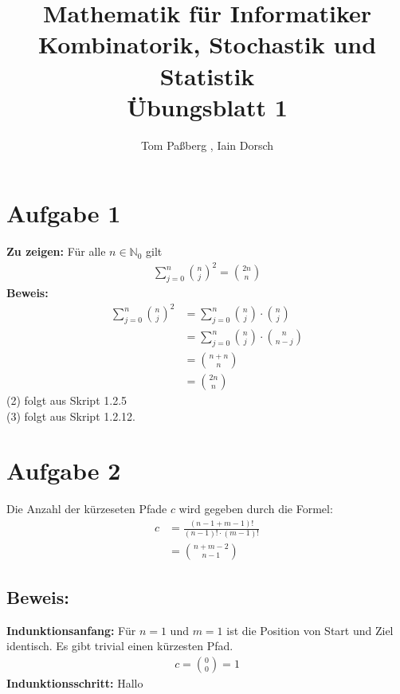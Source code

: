 \documentclass[a4paper]{scrartcl}
\title{Mathematik für Informatiker \\ Kombinatorik, Stochastik und Statistik \\ Übungsblatt 1}
\author{Tom Paßberg , Iain Dorsch}
\date{}
\begin{document}
\maketitle

\newpage
\section*{Aufgabe 1}
\textbf{Zu zeigen:} Für alle $n \in \mathbb{N}_0$ gilt
\begin{align*}
    \sum_{j=0}^{n} \binom{n}{j}^2 = \binom{2n}{n}
\end{align*}
\textbf{Beweis:}
\begin{align}
    \sum_{j=0}^{n} \binom{n}{j}^2 &= \sum_{j=0}^{n} \binom{n}{j} \cdot \binom{n}{j} \\
    &= \sum_{j=0}^{n} \binom{n}{j} \cdot \binom{n}{n - j} \\
    &= \binom{n + n}{n} \\
    &= \binom{2n}{n}
\end{align}
(2) folgt aus Skript 1.2.5 \\
(3) folgt aus Skript 1.2.12.\\

\section*{Aufgabe 2}
Die Anzahl der kürzeseten Pfade $c$ wird gegeben durch die Formel:
\begin{align*}
    c &= \frac{(n - 1 + m  - 1)!}{(n-1)! \cdot (m-1)!} \\[12px]
    &= \binom{n + m - 2}{n - 1}
\end{align*}

\subsection*{Beweis:}
\textbf{Indunktionsanfang:}
Für $n = 1$ und $m = 1$ ist die Position von Start und Ziel identisch. 
Es gibt trivial einen kürzesten Pfad. \\
\begin{align*}
    c = \binom{0}{0} = 1
\end{align*}
\textbf{Indunktionsschritt:} 
Hallo
\end{document}
